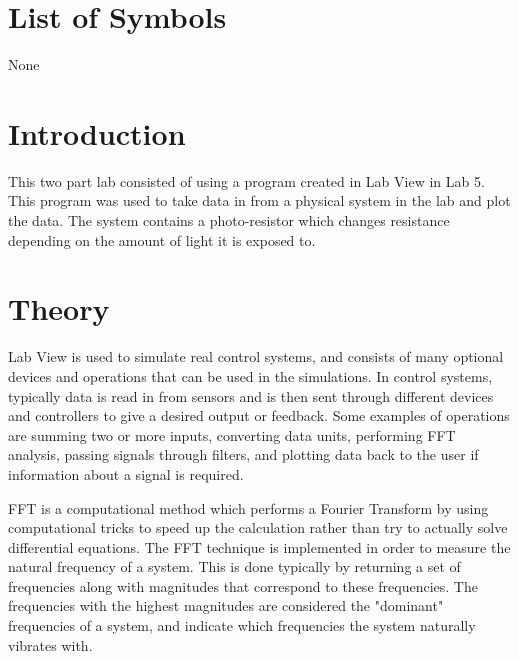 \documentclass[12pt]{article}
\begin{document}

\tableofcontents

\listoffigures

\bigskip


\section*{\fontsize{12}{12}\selectfont \large List of Symbols}
None




\newpage



\section*{\fontsize{12}{12}\selectfont \large Introduction}
This two part lab consisted of using a program created in Lab View in Lab 5. This program was used to take data in from a physical system in the lab and plot the data. The system contains a photo-resistor which changes resistance depending on the amount of light it is exposed to.


\section*{\fontsize{12}{12}\selectfont \large Theory}
Lab View is used to simulate real control systems, and consists of many optional devices and operations that can be used in the simulations. In control systems, typically data is read in from sensors and is then sent through different devices and controllers to give a desired output or feedback. Some examples of operations are summing two or more inputs, converting data units, performing FFT analysis, passing signals through filters, and plotting data back to the user if information about a signal is required.
\bigskip

FFT is a computational method which performs a Fourier Transform by using computational tricks to speed up the calculation rather than try to actually solve differential equations. The FFT technique is implemented in order to measure the natural frequency of a system. This is done typically by returning a set of frequencies along with magnitudes that correspond to these frequencies. The frequencies with the highest magnitudes are considered the "dominant" frequencies of a system, and indicate which frequencies the system naturally vibrates with.
\bigskip
\end{document}
